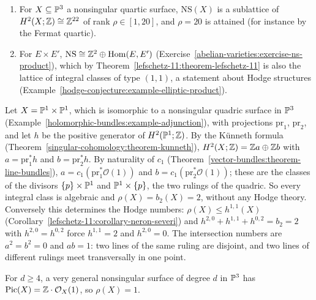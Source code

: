 \begin{example}\label{lefschetz-11:example-neron-severi}
\begin{enumerate}
\item For $X \subseteq \mathbb{P}^3$ a nonsingular quartic surface, $\mathrm{NS}(X)$ is a sublattice of $H^2(X; \mathbb{Z}) \cong \mathbb{Z}^{22}$ of rank $\rho \in [1, 20]$, and $\rho = 20$ is attained (for instance by the Fermat quartic).
\item For $E \times E'$, $\mathrm{NS} \cong \mathbb{Z}^2 \oplus \operatorname{Hom}(E, E')$ (Exercise~\ref{abelian-varieties:exercise-ns-product}), which by Theorem~\ref{lefschetz-11:theorem-lefschetz-11} is also the
lattice of integral classes of type $(1,1)$, a statement about Hodge structures (Example~\ref{hodge-conjecture:example-elliptic-product}).
\end{enumerate}
\end{example}

\begin{example}\label{lefschetz-11:example-quadric}
Let $X = \mathbb{P}^1 \times \mathbb{P}^1$, which is isomorphic to a nonsingular quadric surface in $\mathbb{P}^3$ (Example~\ref{holomorphic-bundles:example-adjunction}), with projections $\mathrm{pr}_1$, $\mathrm{pr}_2$, and let $h$ be the
positive generator of $H^2(\mathbb{P}^1; \mathbb{Z})$. By the K\"unneth formula (Theorem~\ref{singular-cohomology:theorem-kunneth}), $H^2(X; \mathbb{Z}) = \mathbb{Z} a \oplus \mathbb{Z} b$ with $a = \mathrm{pr}_1^*h$ and $b = \mathrm{pr}_2^*h$. By
naturality of $c_1$ (Theorem~\ref{vector-bundles:theorem-line-bundles}), $a = c_1(\mathrm{pr}_1^*\mathcal{O}(1))$ and $b = c_1(\mathrm{pr}_2^*\mathcal{O}(1))$; these are the classes of the divisors
$\{p\} \times \mathbb{P}^1$ and $\mathbb{P}^1 \times \{p\}$, the two rulings of the quadric. So every integral class is algebraic and $\rho(X) = b_2(X) = 2$, without any Hodge theory. Conversely this determines the Hodge
numbers: $\rho(X) \leq h^{1,1}(X)$ (Corollary~\ref{lefschetz-11:corollary-neron-severi}) and $h^{2,0} + h^{1,1} + h^{0,2} = b_2 = 2$ with $h^{2,0} = h^{0,2}$ force $h^{1,1} = 2$ and $h^{2,0} = 0$. The
intersection numbers are $a^2 = b^2 = 0$ and $ab = 1$: two lines of the same ruling are disjoint, and two lines of different rulings meet transversally in one point.
\end{example}

\begin{theorem}\label{lefschetz-11:theorem-noether-lefschetz}
For $d \geq 4$, a very general nonsingular surface of degree $d$ in $\mathbb{P}^3$ has $\operatorname{Pic}(X) = \mathbb{Z}\cdot\mathcal{O}_X(1)$, so $\rho(X) = 1$.
\end{theorem}

